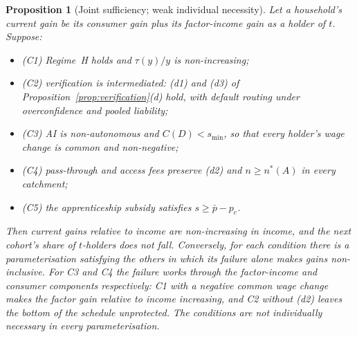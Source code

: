 \documentclass[12pt]{article}
\newtheorem{proposition}{Proposition}
\theoremstyle{remark}
\begin{document}
\begin{proposition}[Joint sufficiency; weak individual necessity]\label{prop:synthesis}
Let a household's current gain be its consumer gain plus its factor-income gain as a holder of $t$. Suppose:
\begin{itemize}[itemsep=0pt]
\item[] (C1) Regime~H holds and $\tau(y)/y$ is non-increasing;
\item[] (C2) verification is intermediated: (d1) and (d3) of Proposition~\ref{prop:verification}(d) hold, with default routing under overconfidence and pooled liability;
\item[] (C3) AI is non-autonomous and $C(D)<s_{\min}$, so that every holder's wage change is common and non-negative;
\item[] (C4) pass-through and access fees preserve (d2) and $n\ge n^*(A)$ in every catchment;
\item[] (C5) the apprenticeship subsidy satisfies $s\ge\bar p-p_c$.
\end{itemize}
Then current gains relative to income are non-increasing in income, and the next cohort's share of $t$-holders does not fall. Conversely, for each condition there is a parameterisation satisfying the others in which its failure alone makes gains non-inclusive. For C3 and C4 the failure works through the factor-income and consumer components respectively: C1 with a negative common wage change makes the factor gain relative to income increasing, and C2 without (d2) leaves the bottom of the schedule unprotected. The conditions are not individually necessary in every parameterisation.
\end{proposition}
\end{document}
